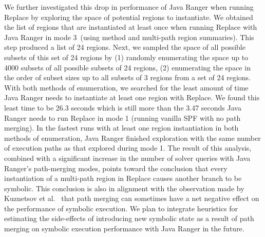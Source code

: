 We further investigated this drop in performance of Java Ranger when running Replace by exploring the space of potential
regions to instantiate.
%
We obtained the list of regions that are instantiated at least once when running Replace with Java Ranger in mode 3~(using
method and multi-path region summaries).
%
This step produced a list of 24 regions.
%
Next, we sampled the space of all possible subsets of this set of 24 regions by
%
(1) randomly enumerating the space up to 4000 subsets of all possible subsets of 24 regions,
%
(2) enumerating the space in the order of subset sizes up to all subsets of 3 regions from a set of 24 regions.
%
With both methods of enumeration, we searched for the least amount of time Java Ranger needs to instantiate at least one
region with Replace.
%
We found this least time to be 26.3 seconds which is still more than the 3.47 seconds Java Ranger needs to run
Replace in mode 1 (running vanilla SPF with no path merging).
%
In the fastest runs with at least one region instantiation in both methods of enumeration, Java Ranger finished
exploration with the same number of execution paths as that explored during mode 1.
%
The result of this analysis, combined with a significant increase in the number of solver queries with Java Ranger's
path-merging modes, points toward the conclusion that every instantiation of a multi-path region in Replace causes another branch to be
symbolic.
%
This conclusion is also in alignment with the observation made by Kuznetsov et al.~\cite{kuznetsov} that path merging can
sometimes have a net negative effect on the performance of symbolic execution.
%
We plan to integrate heuristics for estimating the side-effects of introducing new symbolic state as a result of
path merging on symbolic execution performance with Java Ranger in the future.
